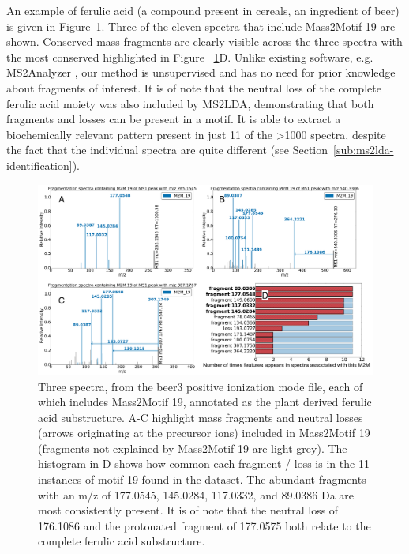 An example of ferulic acid (a compound present in cereals, an ingredient of beer) is given in Figure~\ref{fig:m2lda-ferulic-acid}. Three of the eleven spectra that include Mass2Motif 19 are shown. Conserved mass fragments are clearly visible across the three spectra with the most conserved highlighted in Figure ~\ref{fig:m2lda-ferulic-acid}D. Unlike existing software, e.g. MS2Analyzer \cite{ma2014ms2analyzer}, our method is unsupervised and has no need for prior knowledge about fragments of interest. It is of note that the neutral loss of the complete ferulic acid moiety was also included by MS2LDA, demonstrating that both fragments and losses can be present in a motif. It is able to extract a biochemically relevant pattern present in just 11 of the >1000 spectra, despite the fact that the individual spectra are quite different (see Section~\ref{sub:ms2lda-identification}).   

\begin{figure}[!htbp]
\centering\includegraphics[width=1.0\linewidth]{07-lda/figures/ferulic_acid.pdf}
\centering\caption{Three spectra, from the beer3 positive ionization mode file, each of which includes Mass2Motif 19, annotated as the plant derived ferulic acid substructure. A-C highlight mass fragments and neutral losses (arrows originating at the precursor ions) included in Mass2Motif 19 (fragments not explained by Mass2Motif 19 are light grey). The histogram in D shows how common each fragment / loss is in the 11 instances of motif 19 found in the dataset. The abundant fragments with an m/z of 177.0545, 145.0284, 117.0332, and 89.0386 Da are most consistently present. It is of note that the neutral loss of 176.1086 and the protonated fragment of 177.0575 both relate to the complete ferulic acid substructure.\label{fig:m2lda-ferulic-acid}}
\end{figure}

